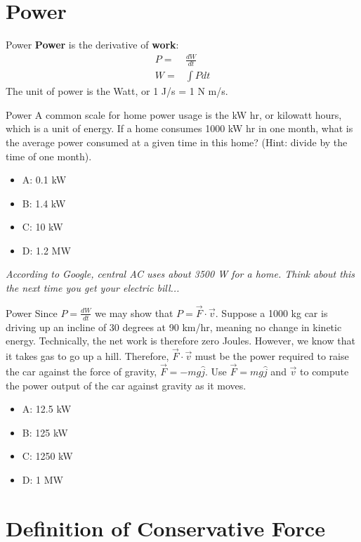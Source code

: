 \documentclass{beamer}
\begin{document}
\section{Power}

\begin{frame}{Power}
\textbf{Power} is the derivative of \textbf{work}:
\begin{align}
P =& \frac{dW}{dt} \\
W =& \int P dt
\end{align}
The unit of power is the Watt, or 1 J/s = 1 N m/s.
\end{frame}

\begin{frame}{Power}
A common scale for home power usage is the kW hr, or kilowatt hours, which is a unit of energy.  If a home consumes 1000 kW hr in one month, what is the average power consumed at a given time in this home?  (Hint: divide by the time of one month).
\begin{itemize}
\item A: 0.1 kW
\item B: 1.4 kW
\item C: 10 kW
\item D: 1.2 MW
\end{itemize}
\textit{According to Google, central AC uses about 3500 W for a home.  Think about this the next time you get your electric bill...}
\end{frame}

\begin{frame}{Power}
Since $P = \frac{dW}{dt}$ we may show that $P = \vec{F} \cdot \vec{v}$.  Suppose a 1000 kg car is driving up an incline of 30 degrees at 90 km/hr, meaning no change in kinetic energy.  Technically, the net work is therefore zero Joules.  However, we know that it takes gas to go up a hill.  Therefore, $\vec{F} \cdot \vec{v}$ must be the power required to raise the car against the force of gravity, $\vec{F} = -mg\hat{j}$.  Use $\vec{F} = mg\hat{j}$ and $\vec{v}$ to compute the power output of the car against gravity as it moves.
\begin{itemize}
\item A: 12.5 kW
\item B: 125 kW
\item C: 1250 kW
\item D: 1 MW
\end{itemize}
\end{frame}

\section{Definition of Conservative Force}
\end{document}
